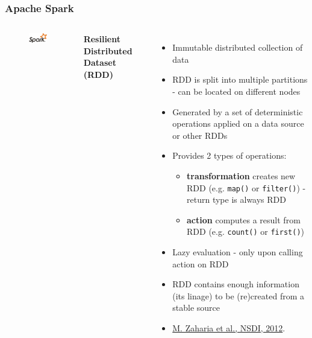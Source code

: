\documentclass[10pt,utf8]{beamer}
\begin{document}
\begin{frame}
	\frametitle{Apache Spark}
	\begin{columns}
		\begin{figure}
			\centering
			\includegraphics[width=2cm]{./img/spark-logo.eps}
		\end{figure}
	\textbf{Resilient Distributed Dataset (RDD)}
		\begin{itemize}
			\item Immutable distributed collection of data
			\item RDD is split into multiple partitions - can be located on different nodes
			\item Generated by a set of deterministic operations applied on a data source or other RDDs
			\item Provides 2 types of operations:
			\begin{itemize}
				\item \textbf{transformation} creates new RDD (e.g. \texttt{map()} or \texttt{filter()}) - return type is always RDD
				\item \textbf{action} computes a result from RDD (e.g. \texttt{count()} or \texttt{first()})
			\end{itemize}
			\item Lazy evaluation - only upon calling action on RDD
			\item RDD contains enough information (its linage) to be (re)created from a stable source 
			\item \color{blue}\href{https://www.usenix.org/conference/nsdi12/technical-sessions/presentation/zaharia}{M. Zaharia et al., NSDI, 2012}.
		\end{itemize}
	\end{columns}
\end{frame}
	
\end{document}
